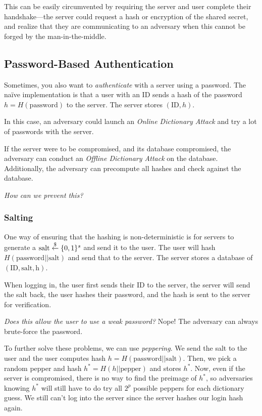 This can be easily circumvented by requiring the server and user complete their handshake---the server could request a hash or encryption of the shared secret, and realize that they are communicating to an adversary when this cannot be forged by the man-in-the-middle.


\subsection{Password-Based Authentication}
Sometimes, you also want to \emph{authenticate} with a server using a password. The na\"ive implementation is that a user with an ID sends a hash of the password $h = H(\mathrm{password})$ to the server. The server stores $(\mathrm{ID}, h)$.


In this case, an adversary could launch an \emph{Online Dictionary Attack} and try a lot of passwords with the server.

If the server were to be compromised, and its database compromised, the adversary can conduct an \emph{Offline Dictionary Attack} on the database. Additionally, the adversary can precompute all hashes and check against the database.

\emph{How can we prevent this? }

\subsubsection{Salting}


One way of ensuring that the hashing is non-deterministic is for servers to generate a $\mathrm{salt}\overset{\$}{\leftarrow}\{0, 1\}^s$ and send it to the user. The user will hash $H(\mathrm{password}||\mathrm{salt})$ and send that to the server. The server stores a database of $(\mathrm{ID}, \mathrm{salt}, \mathrm{h})$.

When logging in, the user first sends their ID to the server, the server will send the salt back, the user hashes their password, and the hash is sent to the server for verification.

\emph{Does this allow the user to use a weak password?} Nope! The adversary can always brute-force the password.

To further solve these problems, we can use \emph{peppering}. We send the salt to the user and the user computes hash $h = H(\mathrm{password}||\mathrm{salt})$. Then, we pick a random pepper and hash $h^* = H(h||\mathrm{pepper})$ and stores $h^*$. Now, even if the server is compromised, there is no way to find the preimage of $h^*$, so adversaries knowing $h^*$ will still have to do try all $2^p$ possible peppers for each dictionary guess. We still can't log into the server since the server hashes our login hash again.


